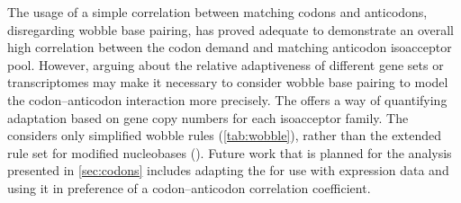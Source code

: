 The usage of a simple correlation between matching codons and anticodons,
disregarding wobble base pairing, has proved adequate to demonstrate an overall
high correlation between the codon demand and matching \trna anticodon
isoacceptor pool. However, arguing about the relative adaptiveness of different
gene sets or transcriptomes may make it  necessary to consider wobble base
pairing to model the codon--anticodon interaction more precisely. The \tai
\citep{Dos_Reis:2003} offers a way of quantifying \trna adaptation based on
\trna gene copy numbers for each isoacceptor family. The \tai considers only
simplified wobble rules (\cref{tab:wobble}), rather than the extended rule set
for modified nucleobases (\citep{Murphy:2004}). Future work that is planned for
the analysis presented in \cref{sec:codons} includes adapting the \tai for use
with \trna expression data and using it in preference of a codon--anticodon
correlation coefficient.
